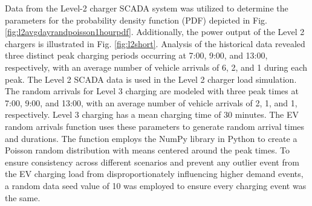 \documentclass[conference, usletter]{IEEEtran}
\begin{document}
Data from the Level-2 charger SCADA system was utilized to determine the parameters for the probability density function (PDF) depicted in Fig. \ref{fig:l2avgdayrandpoisson1hourpdf}. Additionally, the power output of the Level 2 chargers is illustrated in Fig. \ref{fig:l2short}. Analysis of the historical data revealed three distinct peak charging periods occurring at 7:00, 9:00, and  13:00, respectively, with an average number of vehicle arrivals of 6, 2, and 1 during each peak. The Level 2 SCADA data is used in the Level 2 charger load simulation. The random arrivals for Level 3 charging are modeled with three peak times at 7:00, 9:00, and 13:00, with an average number of vehicle arrivals of 2, 1,  and 1, respectively. Level 3 charging has a mean charging time of 30 minutes. The EV random arrivals function uses these parameters to generate random arrival times and durations. The function employs the NumPy library\cite{NumPy}\cite{numpy_poi} in Python to create a Poisson random distribution with means centered around the peak times. To ensure consistency across different scenarios and prevent any outlier event from the EV charging load from disproportionately influencing higher demand events, a random data seed value of 10 was employed to ensure every charging event was the same. 
\end{document}
